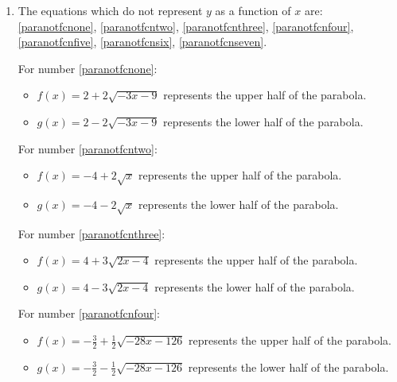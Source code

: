 \begin{enumerate}
\setcounter{enumi}{\value{HW}}

\item  The equations which do not represent $y$ as a function of $x$ are:  \ref{paranotfcnone}, \ref{paranotfcntwo}, \ref{paranotfcnthree}, \ref{paranotfcnfour}, \ref{paranotfcnfive}, \ref{paranotfcnsix}, \ref{paranotfcnseven}.


For number \ref{paranotfcnone}:

\begin{itemize}

\item  $f(x) = 2+2 \sqrt{-3x-9}$ represents the upper half of the parabola.

\item  $g(x) =  2 - 2\sqrt{-3x-9}$ represents the lower half of the parabola.

\end{itemize}

For number \ref{paranotfcntwo}:

\begin{itemize}

\item  $f(x) = -4+2\sqrt{x}$ represents the upper half of the parabola.

\item  $g(x) =  -4 - 2\sqrt{x}$  represents the lower half of the parabola.

\end{itemize}


For number \ref{paranotfcnthree}:

\begin{itemize}

\item   $f(x) =4+3 \sqrt{2x-4}$ represents the upper half of the parabola.

\item  $g(x) =  4-3 \sqrt{2x-4}$  represents the lower half of the parabola.

\end{itemize}


For number \ref{paranotfcnfour}:

\begin{itemize}

\item   $f(x) =-\frac{3}{2} + \frac{1}{2} \sqrt{-28x - 126}$ represents the upper half of the parabola.

\item  $g(x) =-\frac{3}{2} -  \frac{1}{2} \sqrt{-28x - 126}$  represents the lower half of the parabola.


\end{itemize}
\end{enumerate}
